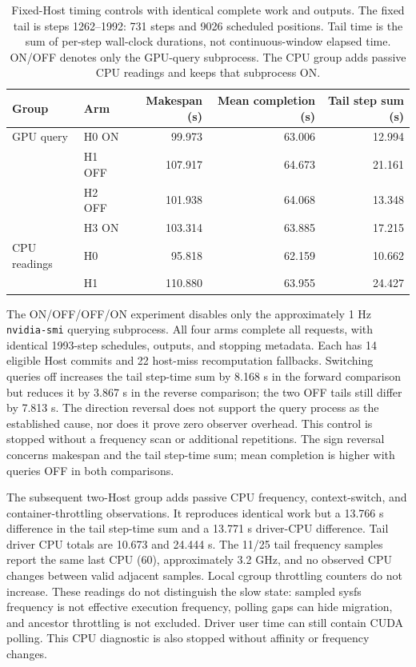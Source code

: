 \documentclass[10pt,a4paper]{article}
\begin{document}
\begin{table}[t]
\centering\small
\caption{Fixed-Host timing controls with identical complete work and outputs.
The fixed tail is steps 1262--1992: 731 steps and 9026 scheduled positions.
Tail time is the sum of per-step wall-clock durations, not continuous-window elapsed time.
ON/OFF denotes only the GPU-query subprocess. The CPU group adds passive CPU
readings and keeps that subprocess ON.}
\label{tab:timing}
\begin{tabular}{@{}llrrr@{}}
\toprule
Group & Arm & Makespan (s) & Mean completion (s) & Tail step sum (s) \\
\midrule
GPU query & H0 ON  & 99.973 & 63.006 & 12.994 \\
 & H1 OFF & 107.917 & 64.673 & 21.161 \\
 & H2 OFF & 101.938 & 64.068 & 13.348 \\
 & H3 ON & 103.314 & 63.885 & 17.215 \\
\midrule
CPU readings & H0 & 95.818 & 62.159 & 10.662 \\
 & H1 & 110.880 & 63.955 & 24.427 \\
\bottomrule
\end{tabular}
\end{table}

The ON/OFF/OFF/ON experiment disables only the approximately 1 Hz
\texttt{nvidia-smi} querying subprocess. All four arms complete all requests,
with identical 1993-step schedules, outputs, and stopping metadata. Each has
14 eligible Host commits and 22 host-miss recomputation fallbacks. Switching
queries off increases the tail step-time sum by 8.168 s in the forward comparison
but reduces it by 3.867 s in the reverse comparison; the two OFF tails still
differ by 7.813 s.
The direction reversal does not support the query process as the established
cause, nor does it prove zero observer overhead. This control is stopped
without a frequency scan or additional repetitions. The sign reversal concerns
makespan and the tail step-time sum; mean completion is higher with queries OFF
in both comparisons.

The subsequent two-Host group adds passive CPU frequency, context-switch, and
container-throttling observations. It reproduces identical work but a 13.766 s
difference in the tail step-time sum and a 13.771 s driver-CPU difference.
Tail driver CPU totals are 10.673 and 24.444 s. The 11/25 tail frequency samples report the same last
CPU (60), approximately 3.2 GHz, and no observed CPU changes between valid
adjacent samples. Local cgroup throttling counters do not increase. These
readings do not distinguish the slow state: sampled sysfs frequency is not
effective execution frequency, polling gaps can hide migration, and ancestor
throttling is not excluded. Driver user time can still contain CUDA polling.
This CPU diagnostic is also stopped without affinity or frequency changes.
\end{document}
